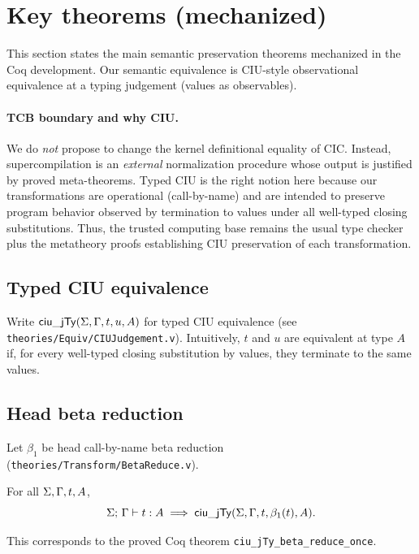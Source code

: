 \section{Key theorems (mechanized)}
\label{sec:theorems}

This section states the main semantic preservation theorems mechanized in the Coq development.
Our semantic equivalence is CIU-style observational equivalence at a typing judgement (values as observables).

\paragraph{TCB boundary and why CIU.}
We do \emph{not} propose to change the kernel definitional equality of CIC.
Instead, supercompilation is an \emph{external} normalization procedure whose output is justified by proved meta-theorems.
Typed CIU is the right notion here because our transformations are operational (call-by-name) and are intended to preserve program behavior observed by termination to values under all well-typed closing substitutions.
Thus, the trusted computing base remains the usual type checker plus the metatheory proofs establishing CIU preservation of each transformation.

\subsection{Typed CIU equivalence}

Write \(\mathsf{ciu\_jTy}(\Sigma,\Gamma,t,u,A)\) for typed CIU equivalence (see \texttt{theories/Equiv/CIUJudgement.v}).
Intuitively, \(t\) and \(u\) are equivalent at type \(A\) if, for every well-typed closing substitution by values, they terminate to the same values.

\subsection{Head beta reduction}

Let \(\beta_1\) be head call-by-name beta reduction (\texttt{theories/Transform/BetaReduce.v}).

\begin{theorem}
\label{thm:beta-ciu}
For all \(\Sigma,\Gamma,t,A\),
\[
  \Sigma;\,\Gamma \vdash t : A \;\Longrightarrow\; \mathsf{ciu\_jTy}(\Sigma,\Gamma,t,\beta_1(t),A).
\]
\end{theorem}

This corresponds to the proved Coq theorem \texttt{ciu\_jTy\_beta\_reduce\_once}.

